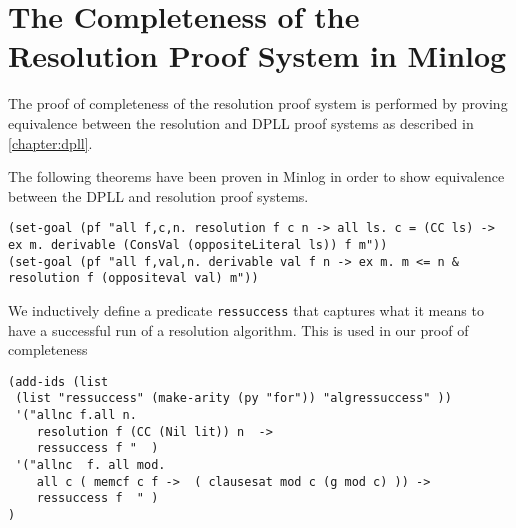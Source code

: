 \section{The Completeness of the Resolution Proof System in Minlog}
The proof of completeness of the resolution proof system is performed by proving equivalence between the resolution and DPLL proof systems as described in \ref{chapter:dpll}.  
\begin{comment}
\begin{center}
\texttt{(set-goal  (pf "all f,c. all c0,n. resolution f c n  -> (memcf c0 f -> F) -> resolution (conccf c0 f) c n "))}
\end{center}

\begin{center}
\texttt{(set-goal (pf "all f,c. all c0,l0,n.  resolution f c n -> memcf c0 f -> ex m. m <= n +1 \& resolution (conccf(inslc  l0 c0)   (remcf c0 f)) (inslc l0 c) m "))}
\end{center}
\end{comment}

The following theorems have been proven in Minlog in order to show equivalence between the DPLL and resolution proof systems. 
\begin{center}
\texttt{(set-goal (pf "all f,c,n. resolution f c n -> all ls. c = (CC ls) -> ex m.  derivable (ConsVal (oppositeLiteral ls)) f m"))} \\
\texttt{(set-goal (pf "all f,val,n. derivable val f n -> ex m. m <= n \& resolution f (oppositeval val) m"))}
\end{center}

We inductively define a predicate \texttt{ressuccess} that captures what it means to have a successful run of a resolution algorithm. This is used in our proof of completeness 

\begin{lstlisting}[caption = "The Inductive Definition of Resolution Completeness"]
(add-ids (list 
 (list "ressuccess" (make-arity (py "for")) "algressuccess" ))
 '("allnc f.all n.                                                                                                                                           
    resolution f (CC (Nil lit)) n  ->                                                                                                    
    ressuccess f "  )
 '("allnc  f. all mod.                                                                                                                                 
    all c ( memcf c f ->  ( clausesat mod c (g mod c) )) ->                                                                
    ressuccess f  " )
)
\end{lstlisting}




